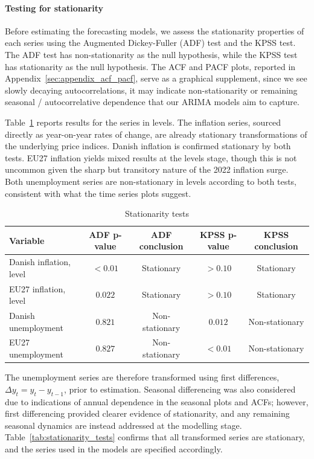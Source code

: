 \paragraph{Testing for stationarity}
Before estimating the forecasting models, we assess the stationarity properties of each series using the Augmented Dickey-Fuller (ADF) test and the KPSS test. The ADF test has non-stationarity as the null hypothesis, while the KPSS test has stationarity as the null hypothesis. The ACF and PACF plots, reported in Appendix~\ref{sec:appendix_acf_pacf}, serve as a graphical supplement, since we see slowly decaying autocorrelations, it may indicate non-stationarity or remaining seasonal / autocorrelative dependence that our ARIMA models aim to capture.

Table~\ref{tab:stationarity_levels} reports results for the series in levels. The inflation series, sourced directly as year-on-year rates of change, are already stationary transformations of the underlying price indices. Danish inflation is confirmed stationary by both tests. EU27 inflation yields mixed results at the levels stage, though this is not uncommon given the sharp but transitory nature of the 2022 inflation surge. Both unemployment series are non-stationary in levels according to both tests, consistent with what the time series plots suggest.

\begin{table}[H]
\centering
\small
\caption{Stationarity tests}
\label{tab:stationarity_levels}
\begin{tabular*}{\textwidth}{@{\extracolsep{\fill}}lcccc}
\hline \hline
\rule{0pt}{12pt}\textbf{Variable} & \textbf{ADF p-value} & \textbf{ADF conclusion} & \textbf{KPSS p-value} & \textbf{KPSS conclusion} \\ [3pt]
\hline
\rule{0pt}{12pt}Danish inflation, level      & $<0.01$ & Stationary     & $>0.10$ & Stationary     \\ [3pt]
\rule{0pt}{12pt}EU27 inflation, level        & $0.022$ & Stationary     & $>0.10$ & Stationary \\ [3pt]
\rule{0pt}{12pt}Danish unemployment          & $0.821$ & Non-stationary & $0.012$ & Non-stationary \\ [3pt]
\rule{0pt}{12pt}EU27 unemployment            & $0.827$ & Non-stationary & $<0.01$ & Non-stationary \\ [3pt]
\hline \hline
\end{tabular*}
\end{table}

The unemployment series are therefore transformed using first differences, $\Delta y_t = y_t - y_{t-1}$, prior to estimation. Seasonal differencing was also considered due to indications of annual dependence in the seasonal plots and ACFs; however, first differencing provided clearer evidence of stationarity, and any remaining seasonal dynamics are instead addressed at the modelling stage. Table~\ref{tab:stationarity_tests} confirms that all transformed series are stationary, and the series used in the models are specified accordingly.


